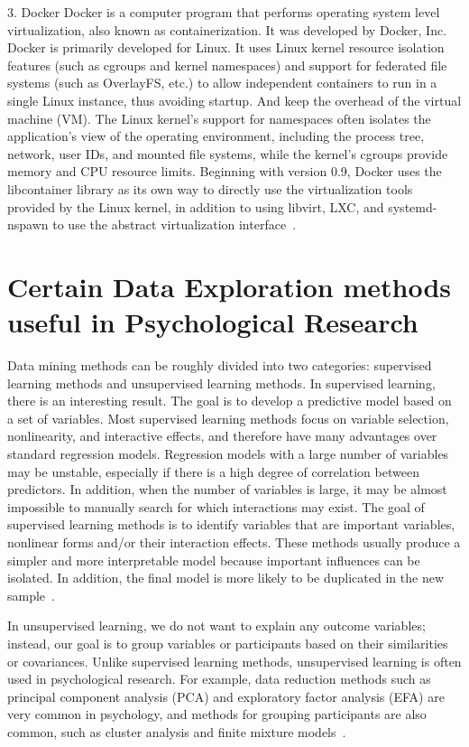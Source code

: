 3. Docker
Docker is a computer program that performs operating system level 
virtualization, also known as containerization. It was developed by
 Docker, Inc. Docker is primarily developed for Linux. It uses 
Linux kernel resource isolation features (such as cgroups and 
kernel namespaces) and support for federated file systems (such as
 OverlayFS, etc.) to allow independent containers to run in a 
single Linux instance, thus avoiding startup. And keep the overhead
 of the virtual machine (VM). The Linux kernel's support for 
namespaces often isolates the application's view of the operating 
environment, including the process tree, network, user IDs, and 
mounted file systems, while the kernel's cgroups provide memory and
 CPU resource limits. Beginning with version 0.9, Docker uses the 
libcontainer library as its own way to directly use the 
virtualization tools provided by the Linux kernel, in addition to 
using libvirt, LXC, and systemd-nspawn to use the abstract 
virtualization interface~\cite{editor10}.

\section{Certain Data Exploration methods useful in Psychological Research}

Data mining methods can be roughly divided into two categories: 
supervised learning methods and unsupervised learning methods. In 
supervised learning, there is an interesting result. The goal is to
 develop a predictive model based on a set of variables. Most 
supervised learning methods focus on variable selection, 
nonlinearity, and interactive effects, and therefore have many 
advantages over standard regression models. Regression models with
 a large number of variables may be unstable, especially if there 
is a high degree of correlation between predictors. In addition, 
when the number of variables is large, it may be almost impossible
 to manually search for which interactions may exist. The goal of 
supervised learning methods is to identify variables that are 
important variables, nonlinear forms and/or their interaction 
effects. These methods usually produce a simpler and more 
interpretable model because important influences can be isolated. 
In addition, the final model is more likely to be duplicated in the
 new sample~\cite{editor11}.

In unsupervised learning, we do not want to explain any outcome 
variables; instead, our goal is to group variables or participants
 based on their similarities or covariances. Unlike supervised 
learning methods, unsupervised learning is often used in 
psychological research. For example, data reduction methods such as
 principal component analysis (PCA) and exploratory factor analysis
 (EFA) are very common in psychology, and methods for grouping 
participants are also common, such as cluster analysis and finite 
mixture models~\cite{editor11}.

